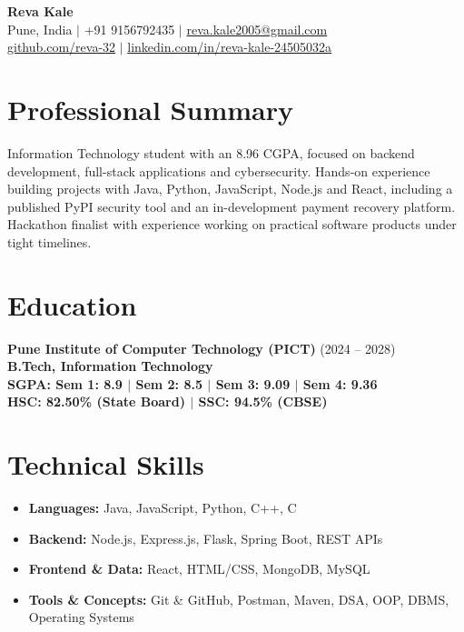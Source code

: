 \documentclass[11pt,a4paper]{article}
\begin{document}
\begin{center}
{\Huge \textbf{Reva Kale}} \\
\vspace{3pt}
Pune, India $|$ +91 9156792435 $|$ \href{mailto:reva.kale2005@gmail.com}{reva.kale2005@gmail.com} \\
\href{https://github.com/reva-32}{github.com/reva-32} $|$ \href{https://www.linkedin.com/in/reva-kale-24505032a}{linkedin.com/in/reva-kale-24505032a}
\end{center}
\section*{Professional Summary}
Information Technology student with an 8.96 CGPA, focused on backend development, full-stack applications and cybersecurity. Hands-on experience building projects with Java, Python, JavaScript, Node.js and React, including a published PyPI security tool and an in-development payment recovery platform. Hackathon finalist with experience working on practical software products under tight timelines.
\section*{Education}
\textbf{Pune Institute of Computer Technology (PICT)} \hfill (2024 -- 2028) \\
\textbf{B.Tech, Information Technology} \\
\textbf{SGPA: Sem 1: 8.9 $|$ Sem 2: 8.5 $|$ Sem 3: 9.09 $|$ Sem 4: 9.36} \\
\textbf{HSC: 82.50\% (State Board) $|$ SSC: 94.5\% (CBSE)}
\section*{Technical Skills}
\begin{itemize}[leftmargin=0.15in, labelsep=0.5em]
    \item \textbf{Languages:} Java, JavaScript, Python, C++, C
    \item \textbf{Backend:} Node.js, Express.js, Flask, Spring Boot, REST APIs
    \item \textbf{Frontend \& Data:} React, HTML/CSS, MongoDB, MySQL
    \item \textbf{Tools \& Concepts:} Git \& GitHub, Postman, Maven, DSA, OOP, DBMS, Operating Systems
\end{itemize}
\end{document}
